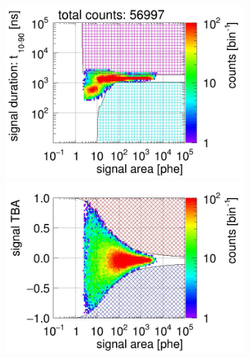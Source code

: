 \begin{landscape}
\begin{figure}[!p]
\begin{subfigure}[t]{0.32\textwidth}
			\caption{}
			\label{fig:signal selection dv 16 03}
		\end{subfigure}
		\begin{subfigure}[t]{0.32\textwidth}
			\centering
			\includegraphics[width=\figurewidth,clip,trim={0 98 0 15}]{Figures/GasTest/CutsValid/res64771/pdpa29Vecfig64771.jpg}
			\includegraphics[width=\figurewidth,clip,trim={0 98 0 40}]{Figures/GasTest/CutsValid/res64771/tbapa29Vecfig64771.jpg}

\end{subfigure}
\end{figure}
\end{landscape}
